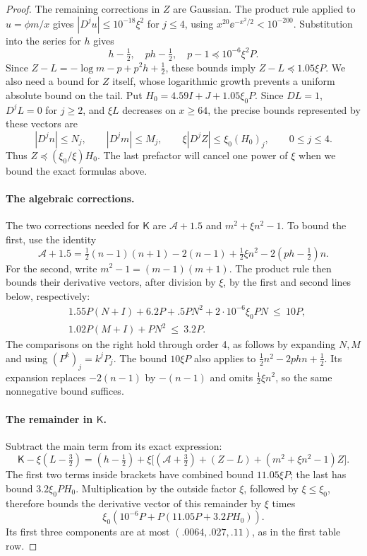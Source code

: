\begin{proof}
The remaining corrections in $Z$ are Gaussian. The product rule applied to $u=\phi m/x$ gives $|D^ju|\le10^{-18}\xi^2$ for $j\le4$, using $x^{20}\ee^{-x^2/2}<10^{-200}$. Substitution into the series for $h$ gives
\[
 h-\tfrac12,\quad ph-\tfrac12,\quad p-1
       \preccurlyeq10^{-6}\xi^2P.
\]
Since $Z-L=-\log m-p+p^2h+\tfrac12$, these bounds imply $Z-L\preccurlyeq1.05\xi P$. We also need a bound for $Z$ itself, whose logarithmic growth prevents a uniform absolute bound on the tail. Put $H_0=4.59I+J+1.05\xi_0P$. Since $DL=1$, $D^jL=0$ for $j\ge2$, and $\xi L$ decreases on $x\ge64$, the precise bounds represented by these vectors are
\[
 |D^jn|\le N_j,\qquad |D^jm|\le M_j,\qquad
 \xi|D^jZ|\le\xi_0(H_0)_j,\qquad 0\le j\le4.
\]
Thus $Z\preccurlyeq(\xi_0/\xi)H_0$. The last prefactor will cancel one power of $\xi$ when we bound the exact formulas above.

\paragraph{The algebraic corrections.}
The two corrections needed for $\mathsf K$ are $\mathcal{A}+1.5$ and $m^2+\xi n^2-1$. To bound the first, use the identity
\[
 \mathcal{A}+1.5
 =\tfrac12(n-1)(n+1)-2(n-1)+\tfrac12\xi n^2
       -2(ph-\tfrac12)n.
\]
For the second, write $m^2-1=(m-1)(m+1)$. The product rule then bounds their derivative vectors, after division by $\xi$, by the first and second lines below, respectively:
\[
\begin{aligned}
 &1.55P(N+I)+6.2P+.5P N^2+2\cdot10^{-6}\xi_0 P N \ \le\ 10P,\\
 &1.02P(M+I)+P N^2\ \le\ 3.2P .
\end{aligned}
\]
The comparisons on the right hold through order 4, as follows by expanding $N,M$ and using $(P^k)_j=k^jP_j$. The bound $10\xi P$ also applies to $\tfrac12n^2-2phn+\tfrac12$. Its expansion replaces $-2(n-1)$ by $-(n-1)$ and omits $\tfrac12\xi n^2$, so the same nonnegative bound suffices.

\paragraph{The remainder in $\mathsf K$.}
Subtract the main term from its exact expression:
\[
 \mathsf K-\xi(L-\tfrac32)
 =(h-\tfrac12)+\xi\big[
   (\mathcal{A}+\tfrac32)+(Z-L)+(m^2+\xi n^2-1)Z\big].
\]
The first two terms inside brackets have combined bound $11.05\xi P$; the last has bound $3.2\xi_0PH_0$. Multiplication by the outside factor $\xi$, followed by $\xi\le\xi_0$, therefore bounds the derivative vector of this remainder by $\xi$ times
\[
 \xi_0 (10^{-6}P + P(11.05P+3.2P H_0)).
\]
Its first three components are at most $(.0064,.027,.11)$, as in the first table row.


\end{proof}
